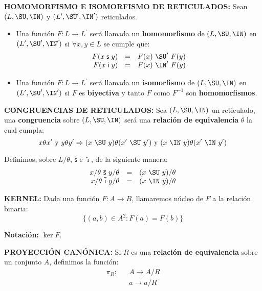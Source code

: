   \vspace{3mm}
  \PN \textbf{HOMOMORFISMO E ISOMORFISMO DE RETICULADOS:} Sean $(L, \SU, \IN)$ y $(L^{\prime}, \SU^{\prime},
  \IN^{\prime})$ reticulados.
  \begin{itemize}
    \item Una función $F: L \rightarrow L^{\prime}$ será llamada un \textbf{homomorfismo} de $(L, \SU, \IN)$ en
      $(L^{\prime}, \SU^{\prime}, \IN^{\prime})$ si $\forall x, y \in L$ se cumple que:
      \[
        \begin{array}{rcl}
          F(x \mathsf{\;s\;} y) &=& F(x) \ \SU^{\prime} \ F(y) \\
          F(x \mathsf{\;i\;} y) &=& F(x) \ \IN^{\prime} \ F(y)
        \end{array}
      \]
    \item Una función $F: L \rightarrow L^{\prime}$ será llamada un \textbf{isomorfismo} de $(L, \SU, \IN)$ en
      $(L^{\prime}, \SU^{\prime}, \IN^{\prime})$ si $F$ es \textbf{biyectiva} y tanto $F$ como $F^{-1}$ son
      \textbf{homomorfismos}.
  \end{itemize}

  \vspace{3mm}
  \PN \textbf{CONGRUENCIAS DE RETICULADOS:} Sea $(L, \SU, \IN)$ un reticulado, una \textbf{congruencia} sobre
  $(L, \SU, \IN)$ será una \textbf{relación de equivalencia} $\theta$ la cual cumpla:
  \[
    x \theta x^{\prime} \text{ y } y \theta y^{\prime} \Rightarrow (x \ \SU \ y) \theta (x^{\prime} \ \SU \ y^{\prime})
    \text{ y } (x \ \IN \ y) \theta (x^{\prime} \ \IN \ y^{\prime})
  \]

  \PN Definimos, sobre $L/\theta$, $\mathsf{\tilde{s}}$ e $\mathsf{\tilde{\imath}}$, de la siguiente manera:
  \[
    \begin{array}{rcl}
      x/\theta \ \mathsf{\tilde{s}} \ y/\theta &=& (x \ \SU \ y)/\theta \\
      x/\theta \ \mathsf{\tilde{i}} \ y/\theta &=& (x \ \IN \ y)/\theta
    \end{array}
  \]

  \vspace{3mm}
  \PN \textbf{KERNEL:} Dada una función $F: A \rightarrow B$, llamaremos núcleo de $F$ a la relación binaria:
  \[
    \{(a,b) \in A^{2}: F(a) = F(b)\}
  \]

  \PN \textbf{Notación:} $\ker F$.

  \vspace{3mm}
  \PN \textbf{PROYECCIÓN CANÓNICA:} Si $R$ es una \textbf{relación de equivalencia} sobre un conjunto $A$, definimos la
  función:
  \[
    \begin{array}{ccc}
      \pi_{R}: && A \rightarrow A/R \\
      && a \rightarrow a/R
    \end{array}
  \]
